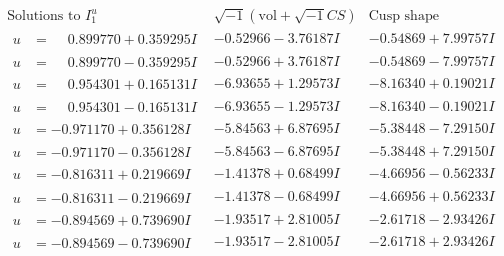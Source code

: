 \documentclass[1p]{elsarticle_modified}
\theoremstyle{definition}
\newcommand{\I}{\sqrt{-1}}
\begin{document}
$$\begin{array}{c|c|c}  
\text{Solutions to }I^u_{1}& \I (\text{vol} + \sqrt{-1}CS) & \text{Cusp shape}\\
 \hline 
\begin{aligned}
u &= \phantom{-}0.899770 + 0.359295 I\end{aligned}
 & -0.52966 - 3.76187 I & -0.54869 + 7.99757 I \\ \hline\begin{aligned}
u &= \phantom{-}0.899770 - 0.359295 I\end{aligned}
 & -0.52966 + 3.76187 I & -0.54869 - 7.99757 I \\ \hline\begin{aligned}
u &= \phantom{-}0.954301 + 0.165131 I\end{aligned}
 & -6.93655 + 1.29573 I & -8.16340 + 0.19021 I \\ \hline\begin{aligned}
u &= \phantom{-}0.954301 - 0.165131 I\end{aligned}
 & -6.93655 - 1.29573 I & -8.16340 - 0.19021 I \\ \hline\begin{aligned}
u &= -0.971170 + 0.356128 I\end{aligned}
 & -5.84563 + 6.87695 I & -5.38448 - 7.29150 I \\ \hline\begin{aligned}
u &= -0.971170 - 0.356128 I\end{aligned}
 & -5.84563 - 6.87695 I & -5.38448 + 7.29150 I \\ \hline\begin{aligned}
u &= -0.816311 + 0.219669 I\end{aligned}
 & -1.41378 + 0.68499 I & -4.66956 - 0.56233 I \\ \hline\begin{aligned}
u &= -0.816311 - 0.219669 I\end{aligned}
 & -1.41378 - 0.68499 I & -4.66956 + 0.56233 I \\ \hline\begin{aligned}
u &= -0.894569 + 0.739690 I\end{aligned}
 & -1.93517 + 2.81005 I & -2.61718 - 2.93426 I \\ \hline\begin{aligned}
u &= -0.894569 - 0.739690 I\end{aligned}
 & -1.93517 - 2.81005 I & -2.61718 + 2.93426 I \\ \hline\begin{aligned}

\end{aligned}
\end{array}$$
\end{document}
